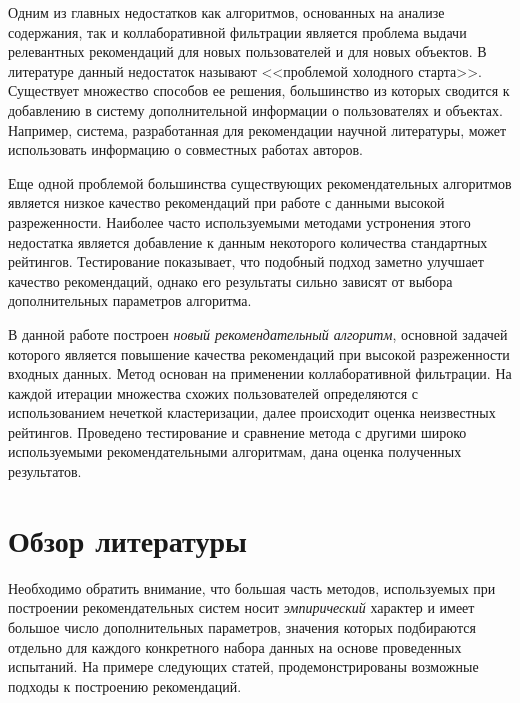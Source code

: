 \documentclass[a4paper, 12pt]{article} %
\begin{document}
\par 
Одним из главных недостатков как алгоритмов, основанных на анализе содержания, так и коллаборативной фильтрации является проблема выдачи релевантных рекомендаций для новых пользователей и для новых объектов. В литературе данный недостаток называют <<проблемой холодного старта>>\cite{coldstart}. Существует множество способов ее решения, большинство из которых сводится к добавлению в систему дополнительной информации о пользователях и объектах. Например, система, разработанная для рекомендации научной литературы, может использовать информацию о совместных работах авторов\cite{socnetclust}.

\par
Еще одной проблемой большинства существующих рекомендательных алгоритмов является низкое качество рекомендаций при работе с данными высокой разреженности. Наиболее часто используемыми методами устронения этого недостатка является добавление к данным некоторого количества стандартных рейтингов\cite{empiricalanalysis}. Тестирование показывает, что подобный подход заметно улучшает качество рекомендаций, однако его результаты сильно зависят от выбора дополнительных параметров алгоритма.  

\par
В данной работе построен \textit{новый рекомендательный алгоритм}, основной задачей которого является повышение качества рекомендаций при высокой разреженности входных данных. Метод основан на применении коллаборативной фильтрации. На каждой итерации множества схожих пользователей определяются с использованием нечеткой кластеризации, далее происходит оценка неизвестных рейтингов. Проведено тестирование и сравнение метода с другими широко используемыми рекомендательными алгоритмам, дана оценка полученных результатов.


\section{Обзор литературы}
\par 
Необходимо обратить внимание, что большая часть методов, используемых при построении рекомендательных систем носит \textit{эмпирический }характер и имеет большое число дополнительных параметров, значения которых подбираются отдельно для каждого конкретного набора данных на основе проведенных испытаний. На примере следующих статей, продемонстрированы возможные подходы к построению рекомендаций.
\end{document}
